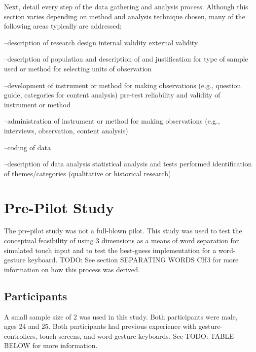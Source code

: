  Next, detail every step of the data gathering and analysis process. Although this section varies depending
on method and analysis technique chosen, many of the following areas typically are addressed:

--description of research design
 internal validity
 external validity

--description of population and description of and justification for type of sample used or method for
selecting units of observation

--development of instrument or method for making observations (e.g., question guide, categories for content
analysis)
 pre-test
 reliability and validity of instrument or method

--administration of instrument or method for making observations (e.g., interviews, observation, content
analysis)

--coding of data

--description of data analysis
 statistical analysis and tests performed
 identification of themes/categories (qualitative or historical research)

\section{Pre-Pilot Study} \label{pre_pilot}

The pre-pilot study was not a full-blown pilot. This study was used to test the conceptual feasibility of using 3 dimensions as a means of word separation for simulated touch input and to test the best-guess implementation for a word-gesture keyboard. TODO: See section SEPARATING WORDS CH3 for more information on how this process was derived.

\subsection{Participants} \label{pre_participants}

A small sample size of 2 was used in this study. Both participants were male, ages 24 and 25. Both participants had previous experience with gesture-controllers, touch screens, and word-gesture keyboards. See TODO: TABLE BELOW for more information.

\begin{table}[h]
	\centering
	\caption[Schedule of Assessments]{\centering Details of Participants.}
	\label{pre_participant_stats}
\end{table}

